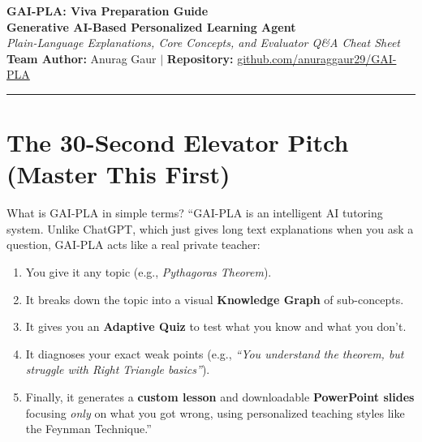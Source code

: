 \documentclass[11pt,a4paper]{article}
\begin{document}
\begin{center}
    {\huge \textbf{GAI-PLA: Viva Preparation Guide}}\\[0.2cm]
    {\large \textbf{Generative AI-Based Personalized Learning Agent}}\\[0.3cm]
    \textit{Plain-Language Explanations, Core Concepts, and Evaluator Q\&A Cheat Sheet}\\[0.2cm]
    \textbf{Team Author:} Anurag Gaur \quad $\vert$ \quad \textbf{Repository:} \href{https://github.com/anuraggaur29/GAI-PLA}{github.com/anuraggaur29/GAI-PLA}
\end{center}
\vspace{0.3cm}
\hrule
\vspace{0.4cm}

\section{The 30-Second Elevator Pitch (Master This First)}

\begin{conceptbox}{What is GAI-PLA in simple terms?}
``GAI-PLA is an intelligent AI tutoring system. Unlike ChatGPT, which just gives long text explanations when you ask a question, GAI-PLA acts like a real private teacher:
\begin{enumerate}[noitemsep]
    \item You give it any topic (e.g., \textit{Pythagoras Theorem}).
    \item It breaks down the topic into a visual \textbf{Knowledge Graph} of sub-concepts.
    \item It gives you an \textbf{Adaptive Quiz} to test what you know and what you don't.
    \item It diagnoses your exact weak points (e.g., \textit{``You understand the theorem, but struggle with Right Triangle basics''}).
    \item Finally, it generates a \textbf{custom lesson} and downloadable \textbf{PowerPoint slides} focusing \textit{only} on what you got wrong, using personalized teaching styles like the Feynman Technique.''
\end{enumerate}
\end{conceptbox}
\end{document}
